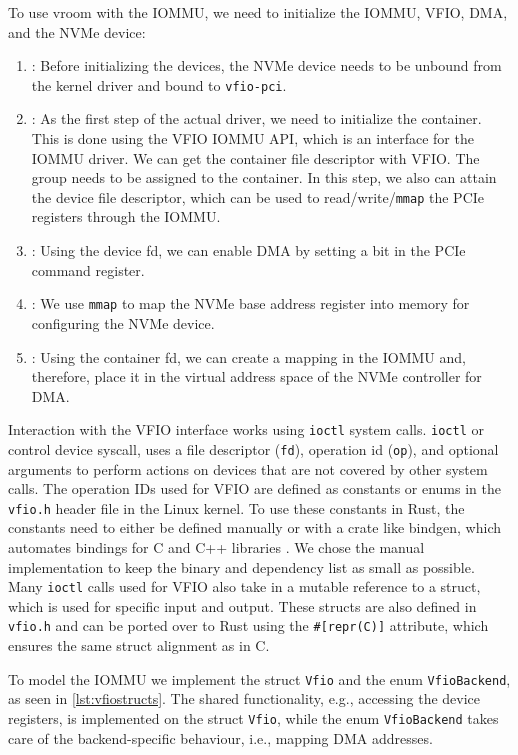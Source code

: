 To use vroom with the IOMMU, we need to initialize the IOMMU, VFIO, DMA, and the NVMe device:
\begin{enumerate}
    \item \textbf{}: Before initializing the devices, the NVMe device needs to be unbound from the kernel driver and bound to \texttt{vfio-pci}.
    \item \textbf{}: As the first step of the actual driver, we need to initialize the container. This is done using the VFIO IOMMU API, which is an interface for the IOMMU driver. We can get the container file descriptor with VFIO. The group needs to be assigned to the container. In this step, we also can attain the device file descriptor, which can be used to read/write/\texttt{mmap} the PCIe registers through the IOMMU.
    \item \textbf{}: Using the device fd, we can enable DMA by setting a bit in the PCIe command register.
    \item \textbf{}: We use \texttt{mmap} to map the NVMe base address register into memory for configuring the NVMe device.
    \item \textbf{}: Using the container fd, we can create a mapping in the IOMMU and, therefore, place it in the virtual address space of the NVMe controller for DMA.
\end{enumerate}

Interaction with the VFIO interface works using \texttt{ioctl} system calls.
\texttt{ioctl} or control device syscall, uses a file descriptor (\texttt{fd}), operation id (\texttt{op}), and optional arguments to perform actions on devices that are not covered by other system calls.
The operation IDs used for VFIO are defined as constants or enums in the \texttt{vfio.h} header file in the Linux kernel. To use these constants in Rust, the constants need to either be defined manually or with a crate like bindgen, which automates bindings for C and C++ libraries \cite{cratebindgen}. We chose the manual implementation to keep the binary and dependency list as small as possible.
Many \texttt{ioctl} calls used for VFIO also take in a mutable reference to a struct, which is used for specific input and output. These structs are also defined in \texttt{vfio.h} and can be ported over to Rust using the \texttt{\#[repr(C)]} attribute, which ensures the same struct alignment as in C.

To model the IOMMU we implement the struct \texttt{Vfio} and the enum \texttt{VfioBackend}, as seen in \autoref{lst:vfiostructs}.
The shared functionality, e.g., accessing the device registers, is implemented on the struct \texttt{Vfio}, while the enum \texttt{VfioBackend} takes care of the backend-specific behaviour, i.e., mapping DMA addresses.


